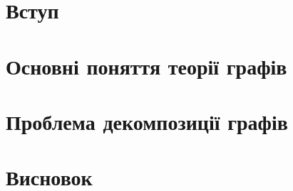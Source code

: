 \documentclass[a4paper,14pt,ukrainian]{extarticle}
\begin{document}


\thispagestyle{empty}
\tableofcontents
\newpage

\setcounter{page}{3}
\section*{\centering Вступ}

\newpage

\section{Основні поняття теорії графів}

\newpage

\section{Проблема декомпозиції графів}


\clearpage
\section*{\centering Висновок}


\clearpage
{}


\end{document}
